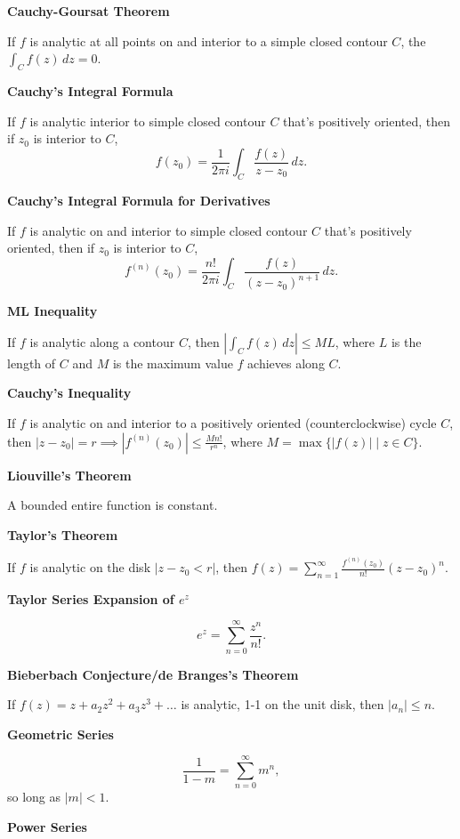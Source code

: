 \documentclass{article}
\begin{document}
\medskip\noindent\textbf{Cauchy-Goursat Theorem}

    If $f$ is analytic at all points on and interior to a simple closed contour $C$, the  $\int_Cf(z)\,dz=0$.

\medskip\noindent\textbf{Cauchy's Integral Formula}

    If $f$ is analytic interior to simple closed contour $C$ that's positively oriented, then if $z_0$ is interior to $C$, $$f(z_0) = \frac1{2\pi i}\int_C\frac{f(z)}{z-z_0}\,dz.$$

\medskip\noindent\textbf{Cauchy's Integral Formula for Derivatives}

    If $f$ is analytic on and interior to simple closed contour $C$ that's positively oriented, then if $z_0$ is interior to $C$, $$f^{(n)}(z_0) = \frac{n!}{2\pi i}\int_C\frac{f(z)}{(z-z_0)^{n+1}}\,dz.$$

\medskip\noindent\textbf{ML Inequality}

    If $f$ is analytic along a contour $C$, then $\left|\int_C f(z) \, dz\right| \leq ML$, where $L$ is the length of $C$ and $M$ is the maximum value $f$ achieves along $C$.

\medskip\noindent\textbf{Cauchy's Inequality}

    If $f$ is analytic on and interior to a positively oriented (counterclockwise) cycle $C$, then $|z-z_0| = r \implies |f^{(n)}(z_0)| \leq \frac{Mn!}{r^n}$, where $M = \max\{|f(z)| \mid z \in C\}$.

\medskip\noindent\textbf{Liouville's Theorem}

    A bounded entire function is constant.

\medskip\noindent\textbf{Taylor's Theorem}

    If $f$ is analytic on the disk $|z-z_0 < r|$, then $f(z) = \sum_{n=1}^\infty\frac{f^{(n)}(z_0)}{n!}(z-z_0)^n$.
    
\medskip\noindent\textbf{Taylor Series Expansion of $e^z$}

    $$e^z = \sum_{n=0}^\infty \frac{z^n}{n!}.$$

\medskip\noindent\textbf{Bieberbach Conjecture/de Branges's Theorem}

    If $f(z) = z + a_2z^2 + a_3z^3 + \hdots$ is analytic, 1-1 on the unit disk, then $|a_n| \leq n$.

\medskip\noindent\textbf{Geometric Series}

    $$\frac1{1-m} = \sum_{n=0}^\infty m^n,$$ so long as $|m| < 1$.

\medskip\noindent\textbf{Power Series}
\end{document}
